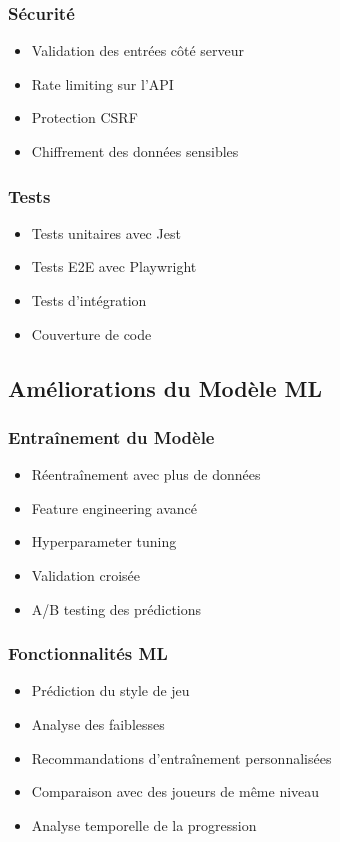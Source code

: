 \documentclass[a4paper,12pt]{article}
\begin{document}
\subsubsection{Sécurité}
\begin{itemize}
    \item Validation des entrées côté serveur
    \item Rate limiting sur l'API
    \item Protection CSRF
    \item Chiffrement des données sensibles
\end{itemize}

\subsubsection{Tests}
\begin{itemize}
    \item Tests unitaires avec Jest
    \item Tests E2E avec Playwright
    \item Tests d'intégration
    \item Couverture de code
\end{itemize}

\subsection{Améliorations du Modèle ML}

\subsubsection{Entraînement du Modèle}
\begin{itemize}
    \item Réentraînement avec plus de données
    \item Feature engineering avancé
    \item Hyperparameter tuning
    \item Validation croisée
    \item A/B testing des prédictions
\end{itemize}

\subsubsection{Fonctionnalités ML}
\begin{itemize}
    \item Prédiction du style de jeu
    \item Analyse des faiblesses
    \item Recommandations d'entraînement personnalisées
    \item Comparaison avec des joueurs de même niveau
    \item Analyse temporelle de la progression
\end{itemize}
\end{document}
